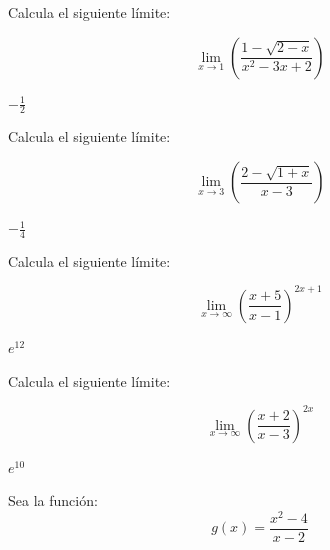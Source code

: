 \documentclass[addpoints,spanish, 12pt,a4paper]{exam}
\begin{document}
\begin{questions}

%
%
%

\question[1] Calcula el siguiente límite:

$$\lim_{x \to 1}\left(\frac{1 - \sqrt{2 - x}}{x^{2} - 3 x + 2}\right)$$

\begin{solution}$- \frac{1}{2}$\end{solution}

\question[1] Calcula el siguiente límite:

$$\lim_{x \to 3}\left(\frac{2 - \sqrt{1 + x}}{x -3}\right)$$

\begin{solution}$- \frac{1}{4}$\end{solution}

\question[1] Calcula el siguiente límite:

$$\lim_{x \to \infty} \left(\frac{x + 5}{x - 1}\right)^{2 x + 1}$$

\begin{solution}$e^{12}$\end{solution}

\question[1] Calcula el siguiente límite:

$$\lim_{x \to \infty} \left(\frac{x + 2}{x - 3}\right)^{2 x}$$

\begin{solution}$e^{10}$\end{solution}

\question Sea la función: $$g(x)=\dfrac{x^2-4}{x-2}$$


\end{questions}
\end{document}
